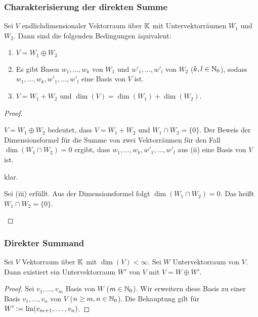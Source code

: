 \subsubsection{Charakterisierung der direkten Summe}
\label{sec:3_6_4}

\begin{thm}
	Sei $ V $ endlichdimensionaler Vektorraum über $ \mathbb K $ mit Untervektorräumen $ W_1 $ und $ W_2 $. Dann sind die folgenden Bedingungen äquivalent:
	\begin{enumerate}
		\item $ V = W_1 \oplus W_2 $
		\item Es gibt Basen $ w_1, \ldots, w_k $ von $ W_1 $ und $ w'_1, \ldots, w'_l $ von $ W_2 $ ($ k,l \in \mathbb N_0 $), sodass $ w_1, \ldots, w_k, w'_1, \ldots, w'_l $ eine Basis von $ V $ ist.
		\item $ V = W_1 + W_2 $ und $ \dim(V) = \dim(W_1) + \dim(W_2) $.
	\end{enumerate}
\end{thm}
\begin{proof}
\begin{description}[font=\normalfont]
	\item[(i)$ \Rightarrow $(ii):]
		$ V = W_1 \oplus W_2 $ bedeutet, dass $ V = W_1 + W_2 $ und $ W_1 \cap W_2 = \{ 0 \} $. Der Beweis der Dimensionsformel für die Summe von zwei Vektorräumen für den Fall $ \dim(W_1 \cap W_2) = 0 $ ergibt, dass $ w_1, \ldots, w_k, w'_1, \ldots, w'_l $ aus (ii) eine Basis von $ V $ ist.
	\item[(ii)$ \Rightarrow $(iii):]
		klar.
	\item[(iii)$ \Rightarrow $(i):]
		Sei (iii) erfüllt. Aus der Dimensionsformel folgt $ \dim(W_1 \cap W_2) = 0 $. Das heißt $ W_1 \cap W_2 = \{ 0 \} $.
\end{description}
\end{proof}

\subsubsection{Direkter Summand}

\begin{klr}
	Sei $ V $ Vektorraum über $ \mathbb K $ mit $ \dim(V) < \infty $. Sei $ W $ Untervektorraum von $ V $. Dann existiert ein Untervektorraum $ W' $ von $ V $ mit $ V = W \oplus W' $.
\end{klr}
\begin{proof}
	Sei $ v_1, \ldots, v_m $ Basis von $ W $ ($ m \in \mathbb N_0 $). Wir erweitern diese Basis zu einer Basis $ v_1, \ldots, v_n $ von $ V $ ($ n \geq m, n \in \mathbb N_0 $). Die Behauptung gilt für $ W' := \operatorname{lin}(v_{m+1}, \ldots, v_n) $.
\end{proof}

